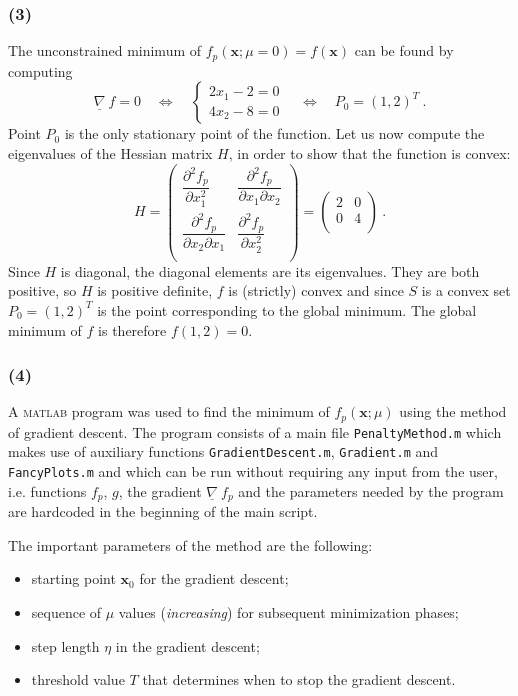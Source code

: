 \documentclass[12pt,titlepage]{article}
\begin{document}
\subsubsection*{(3)}
The unconstrained minimum of $f_p(\bm{x} ; \mu = 0) = f(\bm{x})$ can be found by computing
\[
\underline{\nabla} \ f = 0 \quad \Leftrightarrow \quad \begin{cases} 2x_1 - 2 = 0 \\ 4x_2 - 8 = 0 \end{cases} \quad \Leftrightarrow \quad P_0 = (1, 2)^T \ .
\]
Point $P_0$ is the only stationary point of the function. Let us now compute the eigenvalues of the Hessian matrix $H$, in order to show that the function is convex:
\[
H = 
\begin{pmatrix}
\dfrac{\partial^2 f_p}{\partial x_1^2} & \dfrac{\partial^2 f_p}{\partial x_1 \partial x_2} \\
\dfrac{\partial^2 f_p}{\partial x_2 \partial x_1} & \dfrac{\partial^2 f_p}{\partial x_2^2} \\
 \end{pmatrix} =
 \begin{pmatrix}
2 & 0 \\
0 & 4 \\
 \end{pmatrix} \ .
\]
Since $H$ is diagonal, the diagonal elements are its eigenvalues. They are both positive, so $H$ is positive definite, $f$ is (strictly) convex and since $S$ is a convex set $P_0 = (1, 2)^T$ is the point corresponding to the global minimum. The global minimum of $f$ is therefore $f(1,2) = 0$.

\subsubsection*{(4)}
A \textsc{matlab} program was used to find the minimum of $f_p(\bm{x} ; \mu)$ using the method of gradient descent. The program consists of a main file \texttt{PenaltyMethod.m} which makes use of auxiliary functions \texttt{GradientDescent.m}, \texttt{Gradient.m} and \texttt{FancyPlots.m} and which can be run without requiring any input from the user, i.e. functions $f_p$, $g$, the gradient $\underline{\nabla} \ f_p$ and the parameters needed by the program are hardcoded in the beginning of the main script.

The important parameters of the method are the following:
\begin{itemize}
\setlength\itemsep{-3pt}
\item starting point $\bm{x}_0$ for the gradient descent;
\item sequence of $\mu$ values (\emph{increasing}) for subsequent minimization phases;
\item step length $\eta$ in the gradient descent;
\item threshold value $T$ that determines when to stop the gradient descent.
\end{itemize} 
\end{document}
